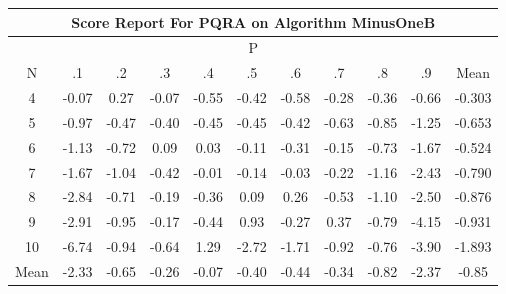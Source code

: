 \documentclass[11pt,a4paper]{report}
\begin{document}
\begin{longtable}{ | c || c | c | c | c | c | c | c | c | c || c |}
\hline
\multicolumn{11}{|c|}{ Score Report For PQRA on Algorithm MinusOneB} \\
\hline
\multicolumn{11}{|c|}{ P } \\
\hline
N & .1 & .2 & .3 & .4 & .5 & .6 & .7 & .8 & .9 & Mean\\
 \hline
 \hline
 \endhead
  4 &  \cellcolor[HTML]{FFFFFF} -0.07 &  \cellcolor[HTML]{F7F7FF} 0.27 &  \cellcolor[HTML]{FFFFFF} -0.07 &  \cellcolor[HTML]{FFEFEF} -0.55 &  \cellcolor[HTML]{FFF7F7} -0.42 &  \cellcolor[HTML]{FFEFEF} -0.58 &  \cellcolor[HTML]{FFF7F7} -0.28 &  \cellcolor[HTML]{FFF7F7} -0.36 &  \cellcolor[HTML]{FFEFEF} -0.66 & -0.303 \\
  5 &  \cellcolor[HTML]{FFE7E7} -0.97 &  \cellcolor[HTML]{FFF7F7} -0.47 &  \cellcolor[HTML]{FFF7F7} -0.40 &  \cellcolor[HTML]{FFF7F7} -0.45 &  \cellcolor[HTML]{FFF7F7} -0.45 &  \cellcolor[HTML]{FFF7F7} -0.42 &  \cellcolor[HTML]{FFEFEF} -0.63 &  \cellcolor[HTML]{FFE7E7} -0.85 &  \cellcolor[HTML]{FFDFDF} -1.25 & -0.653 \\
  6 &  \cellcolor[HTML]{FFDFDF} -1.13 &  \cellcolor[HTML]{FFEFEF} -0.72 &  \cellcolor[HTML]{FFFFFF} 0.09 &  \cellcolor[HTML]{FFFFFF} 0.03 &  \cellcolor[HTML]{FFFFFF} -0.11 &  \cellcolor[HTML]{FFF7F7} -0.31 &  \cellcolor[HTML]{FFFFFF} -0.15 &  \cellcolor[HTML]{FFEFEF} -0.73 &  \cellcolor[HTML]{FFD7D7} -1.67 & -0.524 \\
  7 &  \cellcolor[HTML]{FFD7D7} -1.67 &  \cellcolor[HTML]{FFE7E7} -1.04 &  \cellcolor[HTML]{FFF7F7} -0.42 &  \cellcolor[HTML]{FFFFFF} -0.01 &  \cellcolor[HTML]{FFFFFF} -0.14 &  \cellcolor[HTML]{FFFFFF} -0.03 &  \cellcolor[HTML]{FFF7F7} -0.22 &  \cellcolor[HTML]{FFDFDF} -1.16 &  \cellcolor[HTML]{FFBFBF} -2.43 & -0.790 \\
  8 &  \cellcolor[HTML]{FFB7B7} -2.84 &  \cellcolor[HTML]{FFEFEF} -0.71 &  \cellcolor[HTML]{FFF7F7} -0.19 &  \cellcolor[HTML]{FFF7F7} -0.36 &  \cellcolor[HTML]{FFFFFF} 0.09 &  \cellcolor[HTML]{F7F7FF} 0.26 &  \cellcolor[HTML]{FFEFEF} -0.53 &  \cellcolor[HTML]{FFE7E7} -1.10 &  \cellcolor[HTML]{FFBFBF} -2.50 & -0.876 \\
  9 &  \cellcolor[HTML]{FFB7B7} -2.91 &  \cellcolor[HTML]{FFE7E7} -0.95 &  \cellcolor[HTML]{FFF7F7} -0.17 &  \cellcolor[HTML]{FFF7F7} -0.44 &  \cellcolor[HTML]{E7E7FF} 0.93 &  \cellcolor[HTML]{FFF7F7} -0.27 &  \cellcolor[HTML]{F7F7FF} 0.37 &  \cellcolor[HTML]{FFEFEF} -0.79 &  \cellcolor[HTML]{FF9797} -4.15 & -0.931 \\
  10 &  \cellcolor[HTML]{FF5858} -6.74 &  \cellcolor[HTML]{FFE7E7} -0.94 &  \cellcolor[HTML]{FFEFEF} -0.64 &  \cellcolor[HTML]{DFDFFF} 1.29 &  \cellcolor[HTML]{FFB7B7} -2.72 &  \cellcolor[HTML]{FFD7D7} -1.71 &  \cellcolor[HTML]{FFE7E7} -0.92 &  \cellcolor[HTML]{FFEFEF} -0.76 &  \cellcolor[HTML]{FF9F9F} -3.90 & -1.893 \\
 \hline
 \hline
Mean &  \cellcolor[HTML]{FFC7C7} -2.33 &  \cellcolor[HTML]{FFEFEF} -0.65 &  \cellcolor[HTML]{FFF7F7} -0.26 &  \cellcolor[HTML]{FFFFFF} -0.07 &  \cellcolor[HTML]{FFF7F7} -0.40 &  \cellcolor[HTML]{FFF7F7} -0.44 &  \cellcolor[HTML]{FFF7F7} -0.34 &  \cellcolor[HTML]{FFE7E7} -0.82 &  \cellcolor[HTML]{FFC7C7} -2.37 &  \cellcolor[HTML]{FFE7E7} -0.85
\end{longtable}
\end{document}

